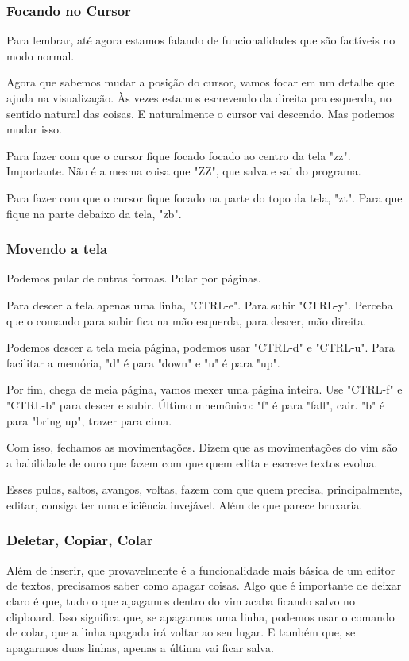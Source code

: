 \documentclass[a4paper, 12pt]{article}
\begin{document}
\subsubsection{Focando no Cursor}
Para lembrar, até agora estamos falando de funcionalidades que são factíveis no modo normal.

Agora que sabemos mudar a posição do cursor, vamos focar em um detalhe que ajuda na visualização.
Às vezes estamos escrevendo da direita pra esquerda, no sentido natural das coisas.
E naturalmente o cursor vai descendo.
Mas podemos mudar isso.

Para fazer com que o cursor fique focado focado ao centro da tela "zz".
Importante. Não é a mesma coisa que "ZZ", que salva e sai do programa.

Para fazer com que o cursor fique focado na parte do topo da tela, "zt".
Para que fique na parte debaixo da tela, "zb".

\subsubsection{Movendo a tela}
Podemos pular de outras formas. Pular por páginas.

Para descer a tela apenas uma linha, "CTRL-e". Para subir "CTRL-y".
Perceba que o comando para subir fica na mão esquerda, para descer, mão direita.

Podemos descer a tela meia página, podemos usar "CTRL-d" e "CTRL-u".
Para facilitar a memória, "d" é para "down" e "u" é para "up".

Por fim, chega de meia página, vamos mexer uma página inteira.
Use "CTRL-f" e "CTRL-b" para descer e subir.
Último mnemônico: "f" é para "fall", cair.
"b" é para "bring up", trazer para cima.

Com isso, fechamos as movimentações.
Dizem que as movimentações do vim são a habilidade de ouro que fazem com que quem edita e escreve textos evolua.

Esses pulos, saltos, avanços, voltas, fazem com que quem precisa, principalmente, editar, consiga ter uma eficiência invejável.
Além de que parece bruxaria.

\subsubsection{Deletar, Copiar, Colar}
Além de inserir, que provavelmente é a funcionalidade mais básica de um editor de textos, precisamos saber como apagar coisas.
Algo que é importante de deixar claro é que, tudo o que apagamos dentro do vim acaba ficando salvo no clipboard.
Isso significa que, se apagarmos uma linha, podemos usar o comando de colar, que a linha apagada irá voltar ao seu lugar.
E também que, se apagarmos duas linhas, apenas a última vai ficar salva.
\end{document}
